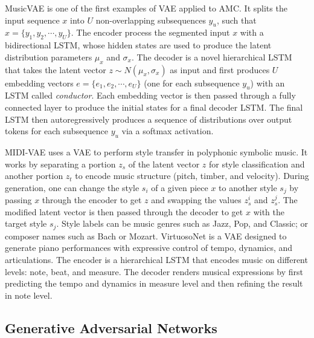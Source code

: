 MusicVAE \cite{Roberts2017} is one of the first examples of VAE applied to AMC. It splits the input sequence $x$ into $U$ non-overlapping subsequences $y_u$, such that $x = \{y_1, y_2, \cdots, y_U\}$. The encoder process the segmented input $x$ with a bidirectional LSTM, whose hidden states are used to produce the latent distribution parameters $\mu_x$ and $\sigma_x$. The decoder is a novel hierarchical LSTM that takes the latent vector $z \sim N(\mu_x, \sigma_x)$ as input and first produces $U$ embedding vectors $e = \{e_1, e_2, \cdots, e_U\}$ (one for each subsequence $y_u$) with an LSTM called \textit{conductor}. Each embedding vector is then passed through a  fully connected layer to produce the initial states for a final decoder LSTM. The final LSTM then autoregressively produces a sequence of distributions over output tokens for each subsequence $y_u$ via a softmax activation.

MIDI-VAE \cite{brunner2018midi} uses a VAE to perform style transfer in polyphonic symbolic music. It works by separating a portion $z_s$ of the latent vector $z$ for style classification and another portion $z_t$ to encode music structure (pitch, timber, and velocity). During generation, one can change the style $s_i$ of a given piece $x$ to another style $s_j$ by passing $x$ through the encoder to get $z$ and swapping the values $z_s^i$ and $z_s^j$. The modified latent vector is then passed through the decoder to get $x$ with the target style $s_j$. Style labels can be music genres such as Jazz, Pop, and Classic; or composer names such as Bach or Mozart.
VirtuosoNet \cite{jeong2019virtuosonet} is a VAE designed to generate piano performances with expressive control of tempo, dynamics, and articulations. The encoder is a hierarchical LSTM that encodes music on different levels: note, beat, and measure. The decoder renders musical expressions by first predicting the tempo and dynamics in measure level and then refining the result in note level.

\subsection{Generative Adversarial Networks}

